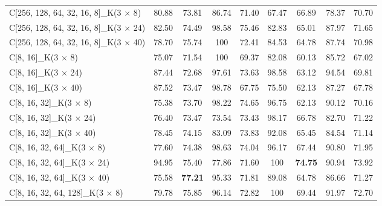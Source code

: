 \documentclass{ieeeaccess}
\begin{document}
{\begin{table*}[htb]
\begin{tabular}{|l|cc|cc|cc|cc|}
		C[256, 128, 64, 32, 16, 8]\_K(3 $\times$ 8)  &      80.88 &       73.81 &        86.74 &         71.40 &      67.47 &      66.89 &      78.37 &      70.70 \\
		C[256, 128, 64, 32, 16, 8]\_K(3 $\times$ 24) &      82.50 &       74.49 &        98.58 &         75.46 &      82.83 &      65.01 &      87.97 &      71.65 \\
		C[256, 128, 64, 32, 16, 8]\_K(3 $\times$ 40) &      78.70 &       75.74 &       100 &            72.41 &      84.53 &      64.78 &      87.74 &      70.98 \\
		\midrule\midrule  
		C[8, 16]\_K(3 $\times$ 8)                    &      75.07 &       71.54 &       100 &         69.37 &      82.08 &         60.13 &      85.72 &      67.02 \\
		C[8, 16]\_K(3 $\times$ 24)                   &      87.44 &       72.68 &        97.61 &         73.63 &      98.58 &      63.12 &      94.54 &      69.81 \\
		C[8, 16]\_K(3 $\times$ 40)                   &      87.52 &       73.47 &        98.78 &         67.75 &      75.50 &      62.13 &      87.27 &      67.78 \\
		C[8, 16, 32]\_K(3 $\times$ 8)                &      75.38 &       73.70 &        98.22 &         74.65 &      96.75 &      62.13 &      90.12 &      70.16 \\
		C[8, 16, 32]\_K(3 $\times$ 24)               &      76.40 &       73.47 &        73.54 &         73.43 &      98.17 &      66.78 &      82.70 &      71.22 \\
		C[8, 16, 32]\_K(3 $\times$ 40)               &      78.45 &       74.15 &        83.09 &         73.83 &      92.08 &      65.45 &      84.54 &      71.14 \\
		C[8, 16, 32, 64]\_K(3 $\times$ 8)            &      77.60 &       74.38 &        98.63 &         74.04 &      96.17 &      67.44 &      90.80 &      71.95 \\
		C[8, 16, 32, 64]\_K(3 $\times$ 24)           &      94.95 &       75.40 &        77.86 &         71.60 &     100 &  \textbf{74.75} &      90.94 &      73.92 \\
		C[8, 16, 32, 64]\_K(3 $\times$ 40)           &      75.58 & \textbf{77.21} &     95.33 &         71.81 &      89.08 &      64.78 &      86.66 &      71.27 \\
		C[8, 16, 32, 64, 128]\_K(3 $\times$ 8)       &      79.78 &       75.85 &        96.14 &         72.82 &     100 &         69.44 &      91.97 &      72.70 \\

\end{tabular}
\end{table*}}
\end{document}
